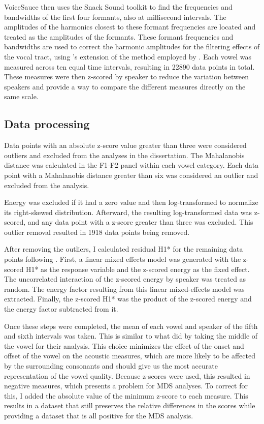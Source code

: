 VoiceSauce then uses the Snack Sound toolkit \citep{sjolanderSnackSoundToolkit2004} to find the frequencies and bandwidths of the first four formants, also at millisecond intervals. The amplitudes of the harmonics closest to these formant frequencies are located and treated as the amplitudes of the formants. These formant frequencies and bandwidths are used to correct the harmonic amplitudes for the filtering effects of the vocal tract, using \citeauthor{iseliAgeSexVowel2007}'s \citeyear{iseliAgeSexVowel2007} extension of the method employed by \citet{hansonGlottalCharacteristicsFemale1997}. Each vowel was measured across ten equal time intervals, resulting in 22890 data points in total. These measures were then z-scored by speaker to reduce the variation between speakers and provide a way to compare the different measures directly on the same scale.

\subsection{Data processing} \label{sec:acousticlandscape:processing}
Data points with an absolute z-score value greater than three were considered outliers and excluded from the analyses in the dissertation. The Mahalanobis distance was calculated in the F1-F2 panel within each vowel category. Each data point with a Mahalanobis distance greater than six was considered an outlier and excluded from the analysis.  

Energy was excluded if it had a zero value and then log-transformed to normalize its right-skewed distribution. Afterward, the resulting log-transformed data was z-scored, and any data point with a z-score greater than three was excluded. This outlier removal resulted in 1918 data points being removed. 

After removing the outliers, I calculated residual H1* for the remaining data points following \citet{chaiH1H2Acoustic2022}. First, a linear mixed effects model was generated with the z-scored H1* as the response variable and the z-scored energy as the fixed effect. The uncorrelated interaction of the z-scored energy by speaker was treated as random. The energy factor resulting from this linear mixed-effects model was extracted. Finally, the z-scored H1* was the product of the z-scored energy and the energy factor subtracted from it.

Once these steps were completed, the mean of each vowel and speaker of the fifth and sixth intervals was taken. This is similar to what \citet{keatingCrosslanguageAcousticSpace2023} did by taking the middle of the vowel for their analysis. This choice minimizes the effect of the onset and offset of the vowel on the acoustic measures, which are more likely to be affected by the surrounding consonants and should give us the most accurate representation of the vowel quality. Because z-scores were used, this resulted in negative measures, which presents a problem for MDS analyses. To correct for this, I added the absolute value of the minimum z-score to each measure. This results in a dataset that still preserves the relative differences in the scores while providing a dataset that is all positive for the MDS analysis.

